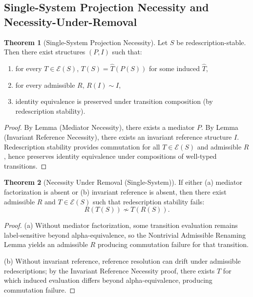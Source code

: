 \documentclass[11pt]{article}
\theoremstyle{definition}
\newtheorem{theorem}{Theorem}
\begin{document}
\subsection{Single-System Projection Necessity and Necessity-Under-Removal}

\begin{theorem}[Single-System Projection Necessity]
Let $S$ be redescription-stable. Then there exist structures $(P,I)$ such that:
\begin{enumerate}[label=(\roman*)]
    \item for every $T\in\mathcal{E}(S)$, $T(S)=\widehat{T}(P(S))$ for some induced $\widehat{T}$,
    \item for every admissible $R$, $R(I)\sim I$,
    \item identity equivalence is preserved under transition composition (by redescription stability).
\end{enumerate}
\end{theorem}

\begin{proof}
By Lemma (Mediator Necessity), there exists a mediator $P$.
By Lemma (Invariant Reference Necessity), there exists an invariant reference structure $I$.
Redescription stability provides commutation for all $T\in\mathcal{E}(S)$ and admissible $R$, hence preserves identity equivalence
under compositions of well-typed transitions.
\end{proof}

\begin{theorem}[Necessity Under Removal (Single-System)]
If either (a) mediator factorization is absent or (b) invariant reference is absent, then there exist admissible $R$ and
$T\in\mathcal{E}(S)$ such that redescription stability fails:
\[
R(T(S))\not\sim T(R(S)).
\]
\end{theorem}

\begin{proof}
(a) Without mediator factorization, some transition evaluation remains label-sensitive beyond alpha-equivalence, so the Nontrivial
Admissible Renaming Lemma yields an admissible $R$ producing commutation failure for that transition.

(b) Without invariant reference, reference resolution can drift under admissible redescriptions; by the Invariant Reference Necessity
proof, there exists $T$ for which induced evaluation differs beyond alpha-equivalence, producing commutation failure.
\end{proof}
\end{document}
